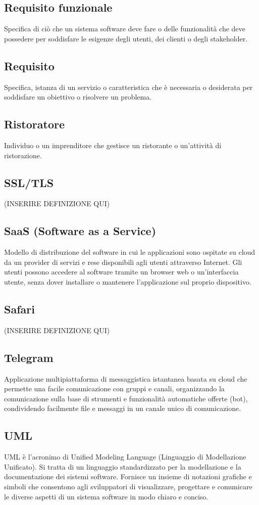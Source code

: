 \subsection{Requisito funzionale}Specifica di ciò che un sistema software deve fare o delle funzionalità che deve possedere per soddisfare le esigenze degli utenti, dei clienti o degli stakeholder.
\subsection{Requisito}Specifica, istanza di un servizio o caratteristica che è necessaria o desiderata per soddisfare un obiettivo o risolvere un problema.
\subsection{Ristoratore}Individuo o un imprenditore che gestisce un ristorante o un'attività di ristorazione.
\subsection{SSL/TLS} (INSERIRE DEFINIZIONE QUI)
\subsection{SaaS (Software as a Service)}Modello di distribuzione del software in cui le applicazioni sono ospitate su cloud da un provider di servizi e rese disponibili agli utenti attraverso Internet. Gli utenti possono accedere al software tramite un browser web o un'interfaccia utente, senza dover installare o mantenere l'applicazione sul proprio dispositivo.
\subsection{Safari} (INSERIRE DEFINIZIONE QUI)
\subsection{Telegram}Applicazione multipiattaforma di messaggistica istantanea basata su cloud che permette una facile comunicazione con gruppi e canali, organizzando la comunicazione sulla base di strumenti e funzionalità automatiche offerte (bot), condividendo facilmente file e messaggi in un canale unico di comunicazione.
\subsection{UML}UML è l'acronimo di Unified Modeling Language (Linguaggio di Modellazione Unificato). Si tratta di un linguaggio standardizzato per la modellazione e la documentazione dei sistemi software. Fornisce un insieme di notazioni grafiche e simboli che consentono agli sviluppatori di visualizzare, progettare e comunicare le diverse aspetti di un sistema software in modo chiaro e conciso.
